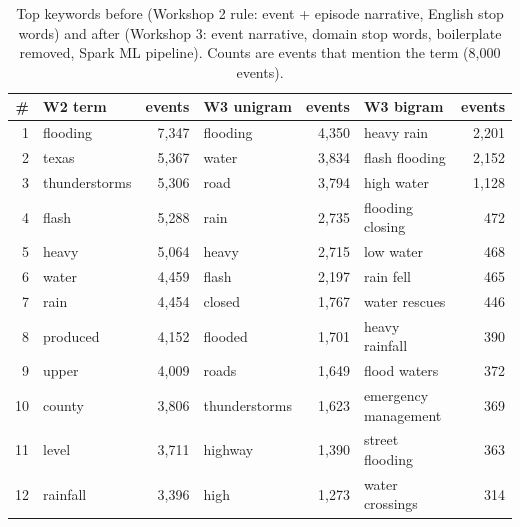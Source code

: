 \begin{table}[H]\centering\footnotesize
\caption{Top keywords before (Workshop 2 rule: event + episode narrative, English stop words) and after (Workshop 3: event narrative, domain stop words, boilerplate removed, Spark ML pipeline). Counts are events that mention the term (8,000 events).}\label{tab:kw}
\begin{tabular}{@{}rlrlrlr@{}}\toprule
\# & W2 term & events & W3 unigram & events & W3 bigram & events\\\midrule
1 & flooding & 7,347 & flooding & 4,350 & heavy rain & 2,201\\
2 & texas & 5,367 & water & 3,834 & flash flooding & 2,152\\
3 & thunderstorms & 5,306 & road & 3,794 & high water & 1,128\\
4 & flash & 5,288 & rain & 2,735 & flooding closing & 472\\
5 & heavy & 5,064 & heavy & 2,715 & low water & 468\\
6 & water & 4,459 & flash & 2,197 & rain fell & 465\\
7 & rain & 4,454 & closed & 1,767 & water rescues & 446\\
8 & produced & 4,152 & flooded & 1,701 & heavy rainfall & 390\\
9 & upper & 4,009 & roads & 1,649 & flood waters & 372\\
10 & county & 3,806 & thunderstorms & 1,623 & emergency management & 369\\
11 & level & 3,711 & highway & 1,390 & street flooding & 363\\
12 & rainfall & 3,396 & high & 1,273 & water crossings & 314\\
\bottomrule\end{tabular}\end{table}